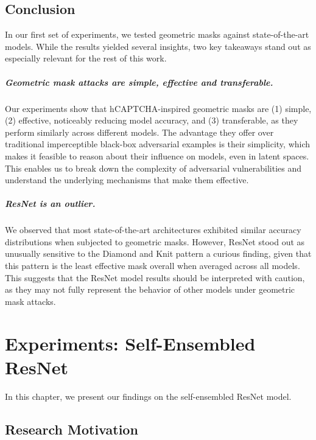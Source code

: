\documentclass[a4paper, oneside]{discothesis}
\begin{document}
\section{Conclusion}

In our first set of experiments, we tested geometric masks against state-of-the-art models. While the results yielded several insights, two key takeaways stand out as especially relevant for the rest of this work.

\paragraph{Geometric mask attacks are simple, effective and transferable.}

Our experiments show that hCAPTCHA-inspired geometric masks are (1) simple, (2) effective, noticeably reducing model accuracy, and (3) transferable, as they perform similarly across different models. The advantage they offer over traditional imperceptible black-box adversarial examples is their simplicity, which makes it feasible to reason about their influence on models, even in latent spaces. This enables us to break down the complexity of adversarial vulnerabilities and understand the underlying mechanisms that make them effective.

\paragraph{ResNet is an outlier.}

We observed that most state-of-the-art architectures exhibited similar accuracy distributions when subjected to geometric masks. However, ResNet stood out as unusually sensitive to the Diamond and Knit pattern \textendash{} a curious finding, given that this pattern is the least effective mask overall when averaged across all models. This suggests that the ResNet model results should be interpreted with caution, as they may not fully represent the behavior of other models under geometric mask attacks.

% 
% 

\chapter{Experiments: Self-Ensembled ResNet}

In this chapter, we present our findings on the self-ensembled ResNet model.

\section{Research Motivation}
\end{document}
